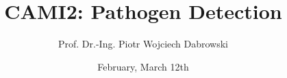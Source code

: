 \usepackage[utf8]{inputenc}
\usepackage[T1]{fontenc}
\usepackage[export]{adjustbox}
\usepackage{amssymb}
\usepackage{xcolor}


\title{CAMI2: Pathogen Detection}
\date{February, March 12th}
\author[PWD]{Prof. Dr.-Ing. Piotr Wojciech Dabrowski}

\usepackage{HTWBeamerTemplate/beamerthemeHTW}
